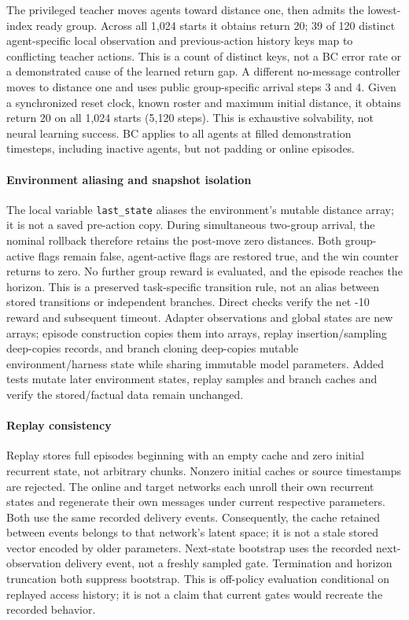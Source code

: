 \documentclass[10pt,a4paper]{article}
\begin{document}
The privileged teacher moves agents toward distance one, then admits the lowest-index ready group. Across all 1,024 starts it obtains return 20; 39 of 120 distinct agent-specific local observation and previous-action history keys map to conflicting teacher actions. This is a count of distinct keys, not a BC error rate or a demonstrated cause of the learned return gap. A different no-message controller moves to distance one and uses public group-specific arrival steps 3 and 4. Given a synchronized reset clock, known roster and maximum initial distance, it obtains return 20 on all 1,024 starts (5,120 steps). This is exhaustive solvability, not neural learning success. BC applies to all agents at filled demonstration timesteps, including inactive agents, but not padding or online episodes.

\paragraph{Environment aliasing and snapshot isolation}
The local variable \texttt{last\_state} aliases the environment's mutable distance array; it is not a saved pre-action copy. During simultaneous two-group arrival, the nominal rollback therefore retains the post-move zero distances. Both group-active flags remain false, agent-active flags are restored true, and the win counter returns to zero. No further group reward is evaluated, and the episode reaches the horizon. This is a preserved task-specific transition rule, not an alias between stored transitions or independent branches. Direct checks verify the net -10 reward and subsequent timeout. Adapter observations and global states are new arrays; episode construction copies them into arrays, replay insertion/sampling deep-copies records, and branch cloning deep-copies mutable environment/harness state while sharing immutable model parameters. Added tests mutate later environment states, replay samples and branch caches and verify the stored/factual data remain unchanged.

\paragraph{Replay consistency} Replay stores full episodes beginning with an empty cache and zero initial recurrent state, not arbitrary chunks. Nonzero initial caches or source timestamps are rejected. The online and target networks each unroll their own recurrent states and regenerate their own messages under current respective parameters. Both use the same recorded delivery events. Consequently, the cache retained between events belongs to that network's latent space; it is not a stale stored vector encoded by older parameters. Next-state bootstrap uses the recorded next-observation delivery event, not a freshly sampled gate. Termination and horizon truncation both suppress bootstrap. This is off-policy evaluation conditional on replayed access history; it is not a claim that current gates would recreate the recorded behavior.
\end{document}
